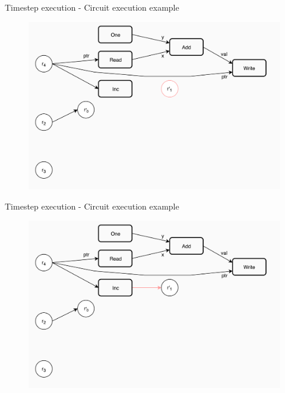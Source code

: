 \documentclass[xcolor={usenames}]{beamer}
\begin{document}
  \begin{frame}{Timestep execution - Circuit execution example}
  	\begin{figure}
  		\centering
  		\includegraphics[width=\textwidth]{../figures/example-circuit-14.png}
  	\end{figure}
  \end{frame}
  \begin{frame}{Timestep execution - Circuit execution example}
  	\begin{figure}
  		\centering
  		\includegraphics[width=\textwidth]{../figures/example-circuit-15.png}
  	\end{figure}
  \end{frame}
\end{document}

